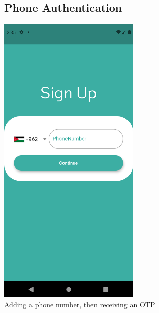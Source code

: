 \documentclass[12pt]{article}
\begin{document}
\begin{figure}[h!]
\vspace{-2cm}
\subsection*{Phone Authentication}
\centerline{\includegraphics[width=0.6\textwidth]{./Screenshots/6.PNG}}
  \caption{Adding a phone number, then receiving an OTP}
\end{figure}
\end{document}
